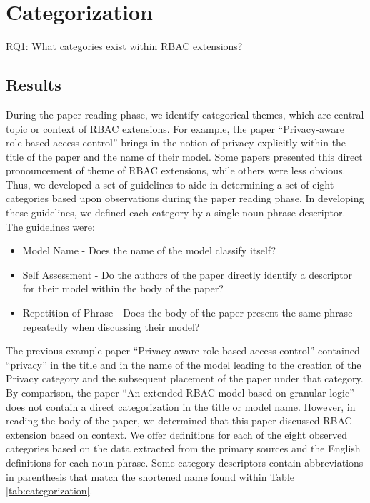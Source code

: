 \section{Categorization} \label{sec:categorization}

RQ1: What categories exist within RBAC extensions?

\subsection{Results}


During the paper reading phase, we identify categorical themes, which are
central topic or context of RBAC extensions. 
For example, the paper ``Privacy-aware role-based access control'' \cite{ni2010privacy} brings in the notion of privacy explicitly within the title of the paper and the name of their model. 
Some papers presented this direct pronouncement of theme of RBAC extensions, while others were less obvious. 
Thus, we developed a set of guidelines to aide in determining a set of eight categories based upon observations during the paper reading phase. 
In developing these guidelines, we defined each category by a single noun-phrase descriptor.
The guidelines were:

\begin{itemize}
\item Model Name - Does the name of the model classify itself?
\item Self Assessment - Do the authors of the paper directly identify a descriptor for their model within the body of the paper?
\item Repetition of Phrase - Does the body of the paper present the same phrase repeatedly when discussing their model?
\end{itemize}

The previous example paper ``Privacy-aware role-based access control'' \cite{ni2010privacy} contained ``privacy'' in
the title and in the name of the model leading to the creation of the Privacy category and the subsequent placement of the paper under that category.
By comparison, the paper ``An extended RBAC model based on granular logic'' \cite{jian2008extended} does not contain a direct categorization in the title or model name. However, in reading the body of the paper, we determined that this paper discussed RBAC extension based on context. 
We offer definitions for each of the eight observed categories based on the data extracted from the primary sources and the English definitions for each noun-phrase. 
Some category descriptors contain abbreviations in parenthesis that match the shortened name found within Table \ref{tab:categorization}.

